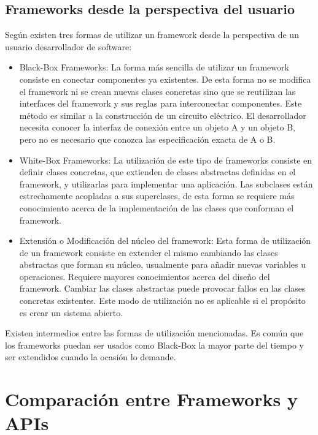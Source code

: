 \subsection{Frameworks desde la perspectiva del usuario}
\label{sec:tipos_framework}
    Según \cite{JohnsonFeb97} existen tres formas de utilizar un framework
    desde la perspectiva de un usuario desarrollador de software: 
\begin{itemize}
    \item Black-Box Frameworks: La forma más sencilla de utilizar un framework
    consiste en conectar componentes ya existentes. De esta forma no se modifica
    el framework ni se crean nuevas clases concretas sino que se reutilizan las
    interfaces del framework y sus reglas para interconectar componentes. Este
    método es similar a la construcción de un circuito eléctrico. El
    desarrollador necesita conocer la interfaz de conexión entre un objeto A y
    un objeto B, pero no es necesario que conozca las especificación exacta de A o B.

    \item White-Box Frameworks: La utilización de este tipo de
    frameworks consiste en definir clases concretas, que extienden de clases
    abstractas definidas en el framework, y utilizarlas para implementar una
    aplicación. Las subclases están estrechamente acopladas a sus superclases,
    de esta forma se requiere más conocimiento acerca de la implementación de
    las clases que conforman el framework.
	
	\item Extensión o Modificación del núcleo del framework:  Esta forma de
	utilización de un framework consiste en extender el mismo cambiando las
	clases abstractas que forman su núcleo, usualmente para añadir nuevas
	variables u operaciones. Requiere mayores conocimientos acerca del diseño del
    framework. Cambiar las clases abstractas puede provocar fallos en las
    clases concretas existentes. Este modo de utilización no es
    aplicable si el propósito es crear un sistema abierto.
\end{itemize}

Existen intermedios entre las formas de utilización mencionadas. Es común
que los frameworks puedan ser usados como Black-Box la mayor parte del tiempo y
ser extendidos cuando la ocasión lo demande.

\section{Comparación entre Frameworks y APIs}

